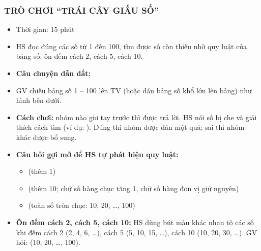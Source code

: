 \documentclass[../main.tex]{subfiles}
\begin{document}
\subsubsection{TRÒ CHƠI “TRÁI CÂY GIẤU SỐ”}
\begin{hd}
    \begin{itemize}
        \item Thời gian: 15 phút
        \item HS đọc đúng các số từ 1 đến 100, tìm được số còn thiếu nhờ quy luật của bảng số; ôn đếm cách 2, cách 5, cách 10.
    \end{itemize}
\end{hd}
\begin{itemize}
    \item \textbf{Câu chuyện dẫn dắt:} 
    \item GV chiếu bảng số 1 -- 100 lên TV (hoặc dán bảng số khổ lớn lên bảng) như hình bên dưới.
    \item \textbf{Cách chơi:} nhóm nào giơ tay trước thì được trả lời. HS nói số bị che và giải thích cách tìm (ví dụ: ). Đúng thì nhóm được dán một quả; sai thì nhóm khác được bổ sung.
    \item \textbf{Câu hỏi gợi mở để HS tự phát hiện quy luật:}
    \begin{itemize}
        \item[--]  (thêm 1)
        \item[--]  (thêm 10; chữ số hàng chục tăng 1, chữ số hàng đơn vị giữ nguyên)
        \item[--]  (toàn số tròn chục: 10, 20, \dots, 100)
    \end{itemize}
\end{itemize}
\begin{center}
    \GAbangso
\end{center}
\begin{itemize}
    \item \textbf{Ôn đếm cách 2, cách 5, cách 10:} HS dùng bút màu khác nhau tô các số khi đếm cách 2 (2, 4, 6, \dots), cách 5 (5, 10, 15, \dots), cách 10 (10, 20, 30, \dots). GV hỏi:  (10, 20, \dots, 100).
\end{itemize}
\end{document}
